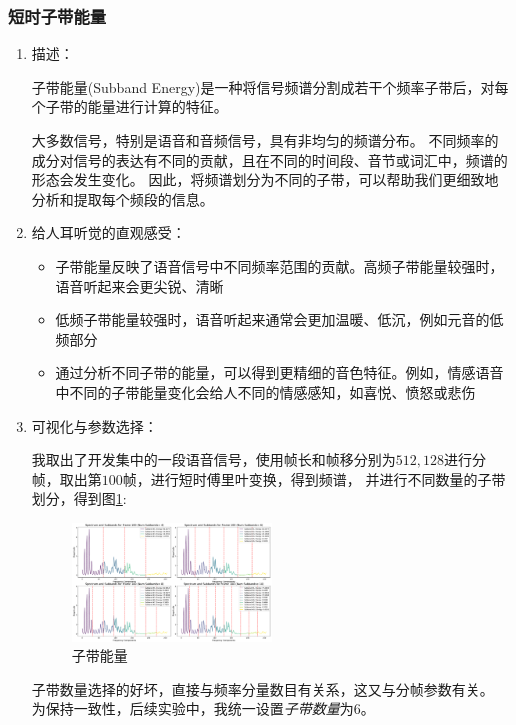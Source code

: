 \documentclass[a4paper]{article}
\begin{document}
\subsubsection{短时子带能量}
\begin{enumerate}
  \item 
  {
    描述：

    子带能量(Subband Energy)是一种将信号频谱分割成若干个频率子带后，对每个子带的能量进行计算的特征。

    大多数信号，特别是语音和音频信号，具有非均匀的频谱分布。
    不同频率的成分对信号的表达有不同的贡献，且在不同的时间段、音节或词汇中，频谱的形态会发生变化。
    因此，将频谱划分为不同的子带，可以帮助我们更细致地分析和提取每个频段的信息。
  }
  \item 
  {
    给人耳听觉的直观感受：
    \begin{itemize}
      \item 子带能量反映了语音信号中不同频率范围的贡献。高频子带能量较强时，语音听起来会更尖锐、清晰

      \item 低频子带能量较强时，语音听起来通常会更加温暖、低沉，例如元音的低频部分
      
      \item 通过分析不同子带的能量，可以得到更精细的音色特征。例如，情感语音中不同的子带能量变化会给人不同的情感感知，如喜悦、愤怒或悲伤
    \end{itemize}
  }
  \item
  {
    可视化与参数选择：

    我取出了开发集中的一段语音信号，使用帧长和帧移分别为$512,128$进行分帧，取出第$100$帧，进行短时傅里叶变换，得到频谱，
    并进行不同数量的子带划分，得到图\ref{fig:subband_energies}:
    \begin{figure}[H]
      \centering
      \includegraphics[width=0.5\textwidth]{figs/subband_energies.pdf}
      \caption{子带能量}
      \label{fig:subband_energies}
    \end{figure}
    子带数量选择的好坏，直接与频率分量数目有关系，这又与分帧参数有关。
    为保持一致性，后续实验中，我统一设置\emph{子带数量}为\emph{$6$}。
  }
\end{enumerate}
\end{document}
